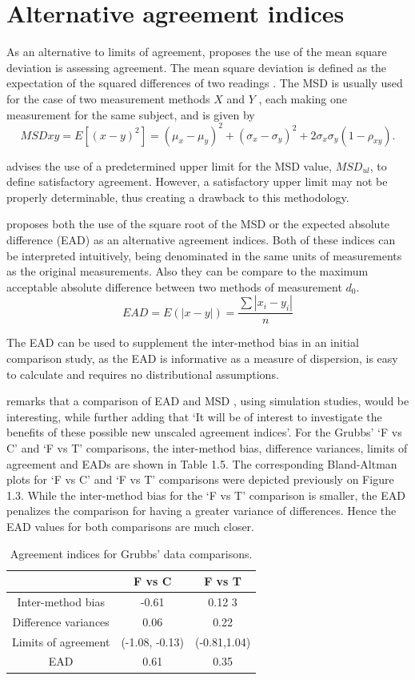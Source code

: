 \documentclass[12pt, a4paper]{report}
\theoremstyle{plain}
\theoremstyle{definition}
\theoremstyle{remark}
\begin{document}
	\section{Alternative agreement indices}
	As an alternative to limits of agreement, \citet{lin2002} proposes the use of
	the mean square deviation is assessing agreement. The mean square
	deviation is defined as the expectation of the squared differences
	of two readings . The MSD is usually used for the case of two
	measurement methods $X$ and $Y$ , each making one measurement for
	the same subject, and is given by
	\[
	MSDxy = E[(x - y)^2]  = (\mu_{x} - \mu_{y})^2 + (\sigma_{x} -
	\sigma_{y})^2 + 2\sigma_{x}\sigma_{y}(1-\rho_{xy}).
	\]
	
	
	\citet{Barnhart} advises the use of a predetermined upper limit
	for the MSD value, $MSD_{ul}$, to define satisfactory agreement.
	However, a satisfactory upper limit may not be properly
	determinable, thus creating a drawback to this methodology.
	
	
	\citet{Barnhart} proposes both the use of the square root of the
	MSD or the expected absolute difference (EAD) as an alternative agreement indices. Both of these indices can be interpreted intuitively, being denominated in the same units of measurements as the original
	measurements. Also they can be compare to the maximum acceptable
	absolute difference between two methods of measurement $d_{0}$.
	\[
	EAD = E(|x - y|) = \frac{\sum |x_{i}- y_{i}|}{n}
	\]
	
	The EAD can be used to supplement the inter-method bias in an
	initial comparison study, as the EAD is informative as a measure
	of dispersion, is easy to calculate and requires no distributional
	assumptions.
	
	\citet{Barnhart} remarks that a comparison of EAD and MSD , using
	simulation studies, would be interesting, while further adding
	that `It will be of interest to investigate the benefits of these
	possible new unscaled agreement indices'. For the Grubbs' `F vs C' and `F vs T' comparisons, the inter-method bias, difference variances, limits of agreement and EADs are shown
	in Table 1.5. The corresponding Bland-Altman plots for `F vs C' and `F vs T' comparisons were depicted previously on Figure 1.3. While the inter-method bias for the `F vs T' comparison is smaller, the EAD penalizes the comparison for having a greater variance of differences. Hence the EAD values for both comparisons are much closer.
	\begin{table}[ht]
		\begin{center}
			\begin{tabular}{|c|c|c|}
				\hline
				& F vs C & F vs T  \\
				\hline
				Inter-method bias & -0.61 & 0.12 3 \\
				Difference variances & 0.06 & 0.22  \\
				Limits of agreement & (-1.08,	-0.13) & (-0.81,1.04) \\
				EAD & 0.61 & 0.35  \\
				\hline
			\end{tabular}
			\caption{Agreement indices for Grubbs' data comparisons.}
		\end{center}
	\end{table}
	
\end{document}
